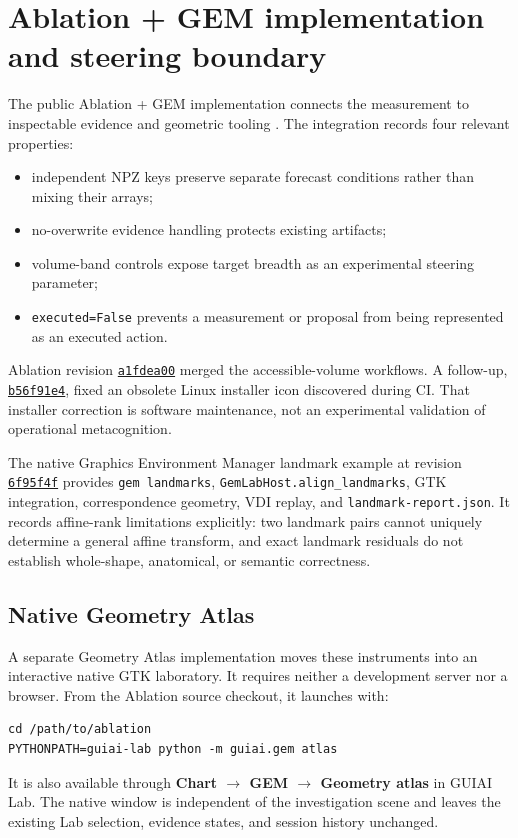 \documentclass[11pt,a4paper]{article}
\begin{document}
\section{Ablation + GEM implementation and steering boundary}
The public Ablation + GEM implementation connects the measurement to inspectable evidence and geometric tooling \cite{ablationintegration,gemlandmarks}. The integration records four relevant properties:
\begin{itemize}[nosep]
  \item independent NPZ keys preserve separate forecast conditions rather than mixing their arrays;
  \item no-overwrite evidence handling protects existing artifacts;
  \item volume-band controls expose target breadth as an experimental steering parameter;
  \item \texttt{executed=False} prevents a measurement or proposal from being represented as an executed action.
\end{itemize}
Ablation revision \href{https://github.com/Ablation-Tool/ablation/commit/a1fdea008d2ae2969e0eafd7fa7d8abe9a9b37b9}{\texttt{a1fdea00}} merged the accessible-volume workflows. A follow-up, \href{https://github.com/Ablation-Tool/ablation/commit/b56f91e4c54cfd996bceea63a38d8136dc1e689f}{\texttt{b56f91e4}}, fixed an obsolete Linux installer icon discovered during CI. That installer correction is software maintenance, not an experimental validation of operational metacognition.

The native Graphics Environment Manager landmark example at revision \href{https://github.com/Ablation-Tool/graphics-environment-manager/commit/6f95f4f}{\texttt{6f95f4f}} provides \texttt{gem landmarks}, \texttt{GemLabHost.align\_landmarks}, GTK integration, correspondence geometry, VDI replay, and \texttt{landmark-report.json}. It records affine-rank limitations explicitly: two landmark pairs cannot uniquely determine a general affine transform, and exact landmark residuals do not establish whole-shape, anatomical, or semantic correctness.

\subsection{Native Geometry Atlas}
A separate Geometry Atlas implementation moves these instruments into an interactive native GTK laboratory. It requires neither a development server nor a browser. From the Ablation source checkout, it launches with:
\begin{lstlisting}
cd /path/to/ablation
PYTHONPATH=guiai-lab python -m guiai.gem atlas
\end{lstlisting}
It is also available through \textbf{Chart $\rightarrow$ GEM $\rightarrow$ Geometry atlas} in GUIAI Lab. The native window is independent of the investigation scene and leaves the existing Lab selection, evidence states, and session history unchanged.
\end{document}
